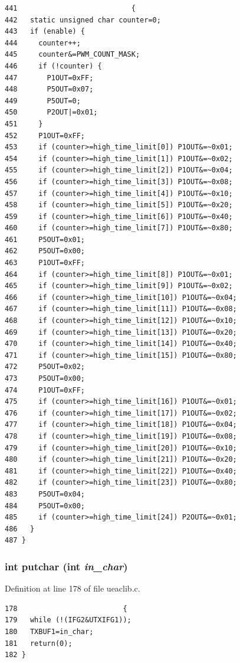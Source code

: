 \footnotesize\begin{verbatim}441                           {
442   static unsigned char counter=0;
443   if (enable) {
444     counter++;
445     counter&=PWM_COUNT_MASK; 
446     if (!counter) {
447       P1OUT=0xFF;
448       P5OUT=0x07;
449       P5OUT=0;
450       P2OUT|=0x01;
451     }
452     P1OUT=0xFF;
453     if (counter>=high_time_limit[0]) P1OUT&=~0x01;
454     if (counter>=high_time_limit[1]) P1OUT&=~0x02;
455     if (counter>=high_time_limit[2]) P1OUT&=~0x04;
456     if (counter>=high_time_limit[3]) P1OUT&=~0x08;
457     if (counter>=high_time_limit[4]) P1OUT&=~0x10;
458     if (counter>=high_time_limit[5]) P1OUT&=~0x20;
459     if (counter>=high_time_limit[6]) P1OUT&=~0x40;
460     if (counter>=high_time_limit[7]) P1OUT&=~0x80;
461     P5OUT=0x01;
462     P5OUT=0x00;
463     P1OUT=0xFF;
464     if (counter>=high_time_limit[8]) P1OUT&=~0x01;
465     if (counter>=high_time_limit[9]) P1OUT&=~0x02;
466     if (counter>=high_time_limit[10]) P1OUT&=~0x04;
467     if (counter>=high_time_limit[11]) P1OUT&=~0x08;
468     if (counter>=high_time_limit[12]) P1OUT&=~0x10;
469     if (counter>=high_time_limit[13]) P1OUT&=~0x20;
470     if (counter>=high_time_limit[14]) P1OUT&=~0x40;
471     if (counter>=high_time_limit[15]) P1OUT&=~0x80;
472     P5OUT=0x02;
473     P5OUT=0x00;
474     P1OUT=0xFF;
475     if (counter>=high_time_limit[16]) P1OUT&=~0x01;
476     if (counter>=high_time_limit[17]) P1OUT&=~0x02;
477     if (counter>=high_time_limit[18]) P1OUT&=~0x04;
478     if (counter>=high_time_limit[19]) P1OUT&=~0x08;
479     if (counter>=high_time_limit[20]) P1OUT&=~0x10;
480     if (counter>=high_time_limit[21]) P1OUT&=~0x20;
481     if (counter>=high_time_limit[22]) P1OUT&=~0x40;
482     if (counter>=high_time_limit[23]) P1OUT&=~0x80;
483     P5OUT=0x04;
484     P5OUT=0x00;
485     if (counter>=high_time_limit[24]) P2OUT&=~0x01;
486   }
487 }
\end{verbatim}\normalsize 


\subsubsection{\setlength{\rightskip}{0pt plus 5cm}int putchar (int {\em in\_\-char})}\label{ueaclib_8c_a15}




Definition at line 178 of file ueaclib.c.

\footnotesize\begin{verbatim}178                         {
179   while (!(IFG2&UTXIFG1));
180   TXBUF1=in_char;
181   return(0);
182 }
\end{verbatim}\normalsize 


